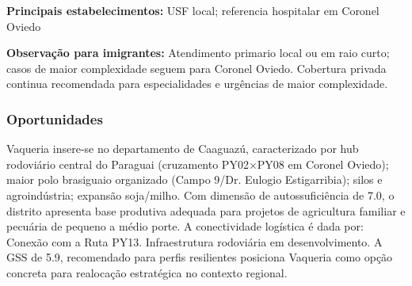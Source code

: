 \textbf{Principais estabelecimentos:} USF local; referencia hospitalar
em Coronel Oviedo

\textbf{Observação para imigrantes:} Atendimento primario local ou em
raio curto; casos de maior complexidade seguem para Coronel Oviedo.
Cobertura privada continua recomendada para especialidades e urgências
de maior complexidade.
\newpage

\subsubsection*{Oportunidades}\label{oport-vaqueria-0520}
Vaqueria insere-se no departamento de Caaguazú, caracterizado por hub rodoviário central do Paraguai (cruzamento PY02×PY08 em Coronel Oviedo); maior polo brasiguaio organizado (Campo 9/Dr. Eulogio Estigarribia); silos e agroindústria; expansão soja/milho. Com dimensão de autossuficiência de 7.0, o distrito apresenta base produtiva adequada para projetos de agricultura familiar e pecuária de pequeno a médio porte. A conectividade logística é dada por: Conexão com a Ruta PY13. Infraestrutura rodoviária em desenvolvimento. A GSS de 5.9, recomendado para perfis resilientes posiciona Vaqueria como opção concreta para realocação estratégica no contexto regional.

